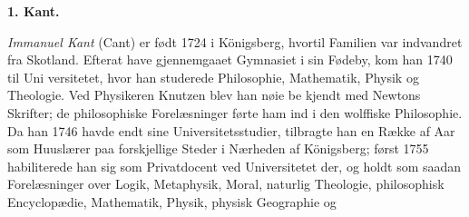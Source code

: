 \documentclass[12pt,a4paper]{book}
\begin{document}
\begin{center}
  \textbf{1. Kant.}
\end{center}
\emph{Immanuel Kant} (Cant) er født 1724 i Königsberg,
hvortil Familien var indvandret fra Skotland. Efterat have
gjennemgaaet Gymnasiet i sin Fødeby, kom han 1740 til Uni\-%
versitetet, hvor han studerede Philosophie, Mathematik, Physik
og Theologie. Ved Physikeren Knutzen blev han nøie be\-%
kjendt med Newtons Skrifter; de philosophiske Forelæsninger
førte ham ind i den wolffiske Philosophie. Da han 1746
havde endt sine Universitetsstudier, tilbragte han en Række
af Aar som Huuslærer paa forskjellige Steder i Nærheden af
Königsberg; først 1755 habiliterede han sig som Privatdocent
ved Universitetet der, og holdt som saadan Forelæsninger over
Logik, Metaphysik, Moral, naturlig Theologie, philosophisk
Encyclopædie, Mathematik, Physik, physisk Geographie og
\end{document}
